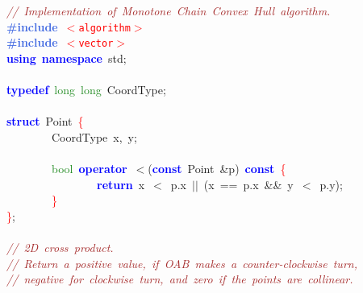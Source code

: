 
{\ttfamily \raggedright {
\noindent
\mbox{}\textit{\textcolor{Brown}{//\ Implementation\ of\ Monotone\ Chain\ Convex\ Hull\ algorithm.}} \\
\mbox{}\textbf{\textcolor{RoyalBlue}{\#include}}\ \texttt{\textcolor{Red}{$<$algorithm$>$}} \\
\mbox{}\textbf{\textcolor{RoyalBlue}{\#include}}\ \texttt{\textcolor{Red}{$<$vector$>$}} \\
\mbox{}\textbf{\textcolor{Blue}{using}}\ \textbf{\textcolor{Blue}{namespace}}\ std\textcolor{BrickRed}{;} \\
\mbox{}\  \\
\mbox{}\textbf{\textcolor{Blue}{typedef}}\ \textcolor{ForestGreen}{long}\ \textcolor{ForestGreen}{long}\ CoordType\textcolor{BrickRed}{;} \\
\mbox{}\  \\
\mbox{}\textbf{\textcolor{Blue}{struct}}\ Point\ \textcolor{Red}{\{} \\
\mbox{}\ \ \ \ \ \ \ \ CoordType\ x\textcolor{BrickRed}{,}\ y\textcolor{BrickRed}{;} \\
\mbox{}\  \\
\mbox{}\ \ \ \ \ \ \ \ \textcolor{ForestGreen}{bool}\ \textbf{\textcolor{Blue}{operator}}\ \textcolor{BrickRed}{$<$(}\textbf{\textcolor{Blue}{const}}\ Point\ \textcolor{BrickRed}{\&}p\textcolor{BrickRed}{)}\ \textbf{\textcolor{Blue}{const}}\ \textcolor{Red}{\{} \\
\mbox{}\ \ \ \ \ \ \ \ \ \ \ \ \ \ \ \ \textbf{\textcolor{Blue}{return}}\ x\ \textcolor{BrickRed}{$<$}\ p\textcolor{BrickRed}{.}x\ \textcolor{BrickRed}{$|$$|$}\ \textcolor{BrickRed}{(}x\ \textcolor{BrickRed}{==}\ p\textcolor{BrickRed}{.}x\ \textcolor{BrickRed}{\&\&}\ y\ \textcolor{BrickRed}{$<$}\ p\textcolor{BrickRed}{.}y\textcolor{BrickRed}{);} \\
\mbox{}\ \ \ \ \ \ \ \ \textcolor{Red}{\}} \\
\mbox{}\textcolor{Red}{\}}\textcolor{BrickRed}{;} \\
\mbox{}\  \\
\mbox{}\textit{\textcolor{Brown}{//\ 2D\ cross\ product.}} \\
\mbox{}\textit{\textcolor{Brown}{//\ Return\ a\ positive\ value,\ if\ OAB\ makes\ a\ counter-clockwise\ turn,}} \\
\mbox{}\textit{\textcolor{Brown}{//\ negative\ for\ clockwise\ turn,\ and\ zero\ if\ the\ points\ are\ collinear.}} \\
}}
